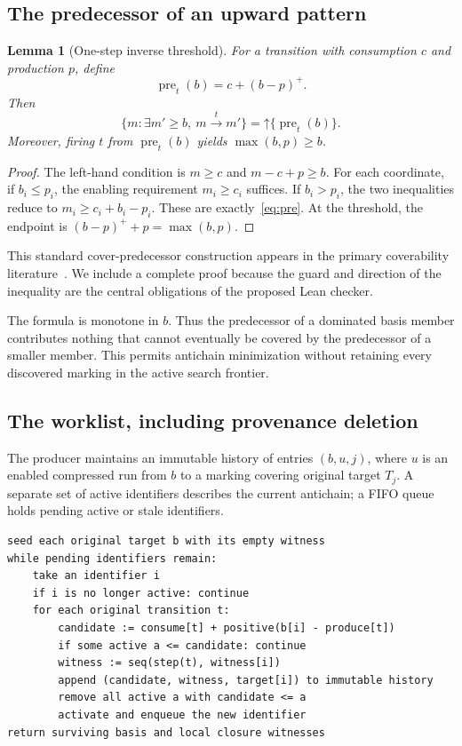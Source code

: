 \documentclass[11pt,a4paper]{article}
\newcommand{\Up}[1]{\mathord{\uparrow}#1}
\newcommand{\pos}[1]{\left(#1\right)^{+}}
\newcommand{\pre}{\operatorname{pre}}
\newtheorem{lemma}[theorem]{Lemma}
\theoremstyle{definition}
\theoremstyle{remark}
\begin{document}
\subsection{The predecessor of an upward pattern}
\begin{lemma}[One-step inverse threshold]\label{lem:pre}
For a transition with consumption $c$ and production $p$, define
\begin{equation}\label{eq:pre}
 \pre_t(b)=c+\pos{b-p}.
\end{equation}
Then
\[
 \{m:\exists m'\ge b,\ m\xrightarrow{t}m'\}
 =\Up{\{\pre_t(b)\}}.
\]
Moreover, firing $t$ from $\pre_t(b)$ yields $\max(b,p)\ge b$.
\end{lemma}
\begin{proof}
The left-hand condition is $m\ge c$ and $m-c+p\ge b$. For each coordinate, if $b_i\le p_i$, the enabling requirement $m_i\ge c_i$ suffices. If $b_i>p_i$, the two inequalities reduce to $m_i\ge c_i+b_i-p_i$. These are exactly~\eqref{eq:pre}. At the threshold, the endpoint is $\pos{b-p}+p=\max(b,p)$.
\end{proof}
This standard cover-predecessor construction appears in the primary coverability literature~\cite{occam}. We include a complete proof because the guard and direction of the inequality are the central obligations of the proposed Lean checker.

The formula is monotone in $b$. Thus the predecessor of a dominated basis member contributes nothing that cannot eventually be covered by the predecessor of a smaller member. This permits antichain minimization without retaining every discovered marking in the active search frontier.

\subsection{The worklist, including provenance deletion}
The producer maintains an immutable history of entries $(b,u,j)$, where $u$ is an enabled compressed run from $b$ to a marking covering original target $T_j$. A separate set of active identifiers describes the current antichain; a FIFO queue holds pending active or stale identifiers.

\par\noindent\begin{minipage}{\linewidth}
\begin{lstlisting}
seed each original target b with its empty witness
while pending identifiers remain:
    take an identifier i
    if i is no longer active: continue
    for each original transition t:
        candidate := consume[t] + positive(b[i] - produce[t])
        if some active a <= candidate: continue
        witness := seq(step(t), witness[i])
        append (candidate, witness, target[i]) to immutable history
        remove all active a with candidate <= a
        activate and enqueue the new identifier
return surviving basis and local closure witnesses
\end{lstlisting}
\end{minipage}\par
\end{document}
